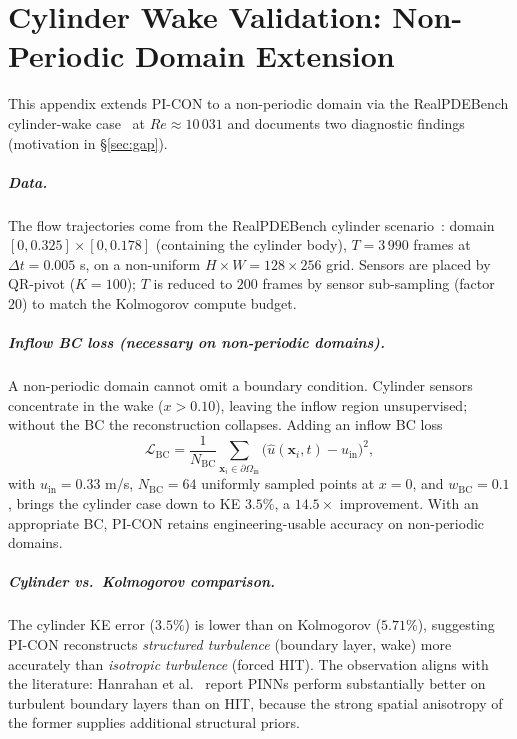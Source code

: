 \chapter{Cylinder Wake Validation: Non-Periodic Domain Extension}
\label{app:cylinder}
\label{sec:cylinder_appendix}

This appendix extends PI-CON to a non-periodic domain via the RealPDEBench cylinder-wake case~\cite{Hu2026RealPDEBench} at $Re\approx 10\,031$ and documents two diagnostic findings (motivation in \S\ref{sec:gap}).

\paragraph{Data.}
The flow trajectories come from the RealPDEBench cylinder scenario~\cite{Hu2026RealPDEBench}: domain $[0, 0.325]\times[0, 0.178]$ (containing the cylinder body), $T=3\,990$ frames at $\Delta t = 0.005$ s, on a non-uniform $H\times W = 128\times 256$ grid. Sensors are placed by QR-pivot ($K=100$); $T$ is reduced to $200$ frames by sensor sub-sampling (factor $20$) to match the Kolmogorov compute budget.

\paragraph{Inflow BC loss (necessary on non-periodic domains).}
A non-periodic domain cannot omit a boundary condition. Cylinder sensors concentrate in the wake ($x>0.10$), leaving the inflow region unsupervised; without the BC the reconstruction collapses. Adding an inflow BC loss
\begin{equation}
    \mathcal{L}_{\text{BC}} = \frac{1}{N_{\text{BC}}}\sum_{\mathbf{x}_i \in \partial\Omega_{\text{in}}} \big(\hat{u}(\mathbf{x}_i, t) - u_{\text{in}}\big)^2,
\end{equation}
with $u_{\text{in}}=0.33$ m/s, $N_{\text{BC}}=64$ uniformly sampled points at $x=0$, and $w_{\text{BC}}=0.1$, brings the cylinder case down to KE $3.5\%$, a $14.5\times$ improvement. With an appropriate BC, PI-CON retains engineering-usable accuracy on non-periodic domains.

\paragraph{Cylinder vs.\ Kolmogorov comparison.}
The cylinder KE error ($3.5\%$) is lower than on Kolmogorov ($5.71\%$), suggesting PI-CON reconstructs \emph{structured turbulence} (boundary layer, wake) more accurately than \emph{isotropic turbulence} (forced HIT). The observation aligns with the literature: Hanrahan et al.~\cite{Hanrahan2023} report PINNs perform substantially better on turbulent boundary layers than on HIT, because the strong spatial anisotropy of the former supplies additional structural priors.


